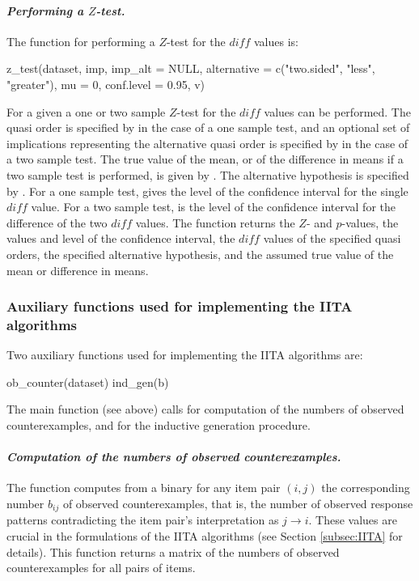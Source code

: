 \documentclass[nojss]{jss}
\begin{document}
\paragraph{\it Performing a $Z$-test.}
The function for performing a $Z$-test for the $\mathit{diff}$ values is:
\begin{Code}
z_test(dataset, imp, imp_alt = NULL, alternative = 
c("two.sided", "less", "greater"), mu = 0, conf.level = 0.95, v)
\end{Code}
For a given  a one or two sample $Z$-test for the $\mathit{diff}$ values 
can be performed. The quasi order is specified by  in the case of a one sample test, 
and an optional set of implications representing the alternative quasi order is specified 
by  in the case of a two sample test. 
The true value of the mean, or of the difference in means if a two sample test is performed,
is given by . The alternative hypothesis is specified by . 
For a one sample test,  gives the level of the confidence interval for 
the single $\mathit{diff}$ value. For a two sample test,  is the level 
of the confidence interval for the difference of the two $\mathit{diff}$ values. 
The function  returns the $Z$- and $p$-values, the values and level
of the confidence interval, the $\mathit{diff}$ values of the specified quasi orders, 
the specified alternative hypothesis, and the assumed true value of the mean
or difference in means.

\subsubsection{Auxiliary functions used for implementing the IITA algorithms}

Two auxiliary functions used for implementing the IITA algorithms are:
\begin{Code}
ob_counter(dataset)
ind_gen(b)
\end{Code}

The main function  (see above) calls  for computation of the numbers 
of observed counterexamples, and  for the inductive generation procedure.

\paragraph{\it Computation of the numbers of observed counterexamples.}
The function  computes from a binary  for any item pair $(i,j)$ 
the corresponding number $b_{ij}$ of observed counterexamples, that is, the number
of observed response patterns contradicting the item pair's interpretation as
$j \rightarrow i$. These values are crucial in the formulations of the IITA algorithms 
(see Section \ref{subsec:IITA} for details). This function returns a matrix of the numbers 
of observed counterexamples for all pairs of items. 
\end{document}
